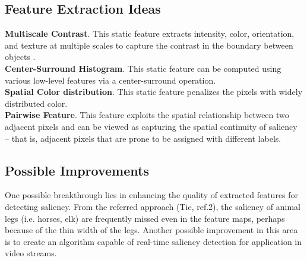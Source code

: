 \documentclass[12pt,a4paper]{article}
\newcommand{\htab}{\hspace*{0.63cm}}
\begin{document}
\begin{multicols}{2}
\subsection{Feature Extraction Ideas}
\textbf{Multiscale Contrast}. This static feature extracts intensity, color, orientation, and texture at multiple scales to capture the contrast in the boundary between objects . \\
\textbf{Center-Surround Histogram}. This static feature can be computed using various low-level features via a center-surround operation.  \\[0.1cm]
\textbf{Spatial Color distribution}. This static feature penalizes the pixels with widely distributed color. \\[0.1cm]
\textbf{Pairwise Feature}. This feature exploits the spatial relationship between two adjacent pixels and can be viewed as capturing the spatial continuity of saliency -- that is, adjacent pixels that are prone to be assigned with different labels. 
\subsection{Possible Improvements}
\htab One possible breakthrough lies in enhancing the quality of extracted features for detecting saliency. From the referred approach (Tie, ref.2), the saliency of animal legs (i.e. horses, elk) are frequently missed even in the feature maps, perhaps because of the thin width of the legs. Another possible improvement in this area is to create an algorithm capable of real-time saliency detection for application in video streams.

\end{multicols}
\end{document}
